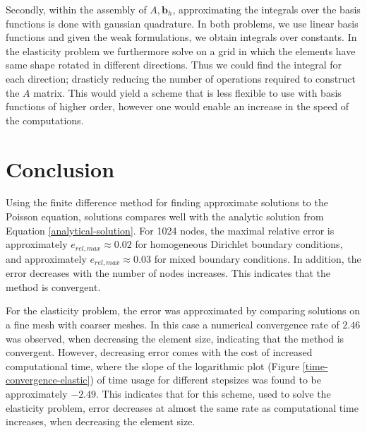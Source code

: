 \documentclass[5pt,a4paper,english]{elsarticle}%
\begin{document}
Secondly, within the assembly of $A,\bm b_h$, approximating the integrals over the basis functions is done with gaussian quadrature. In both problems, we use linear basis functions and given the weak formulations, we obtain integrals over constants. In the elasticity problem we furthermore solve on a grid in which the elements have same shape rotated in different directions. Thus we could find the integral for each direction; drasticly reducing the number of operations required to construct the $A$ matrix. This would yield a scheme that is less flexible to use with basis functions of higher order, however one would enable an increase in the speed of the computations. 
   
\section{Conclusion}

Using the finite difference method for finding approximate solutions to the Poisson equation, solutions compares well with the analytic solution from Equation \eqref{analytical-solution}. For 1024 nodes, the maximal relative error is approximately $e_{rel,max} \approx 0.02$ for homogeneous Dirichlet boundary conditions, and approximately $e_{rel,max} \approx 0.03$ for mixed boundary conditions. In addition, the error decreases with the number of nodes increases. This indicates that the method is convergent.

For the elasticity problem, the error was approximated by comparing solutions on a fine mesh with coarser meshes. In this case a numerical convergence rate of $2.46$ was observed, when decreasing the element size, indicating that the method is convergent. However, decreasing error comes with the cost of increased computational time, where the slope of the logarithmic plot (Figure \ref{time-convergence-elastic}) of time usage for different stepsizes was found to be approximately $-2.49$. This indicates that for this scheme, used to solve the elasticity problem, error decreases at almost the same rate as computational time increases, when decreasing the element size.
	


\end{document}
